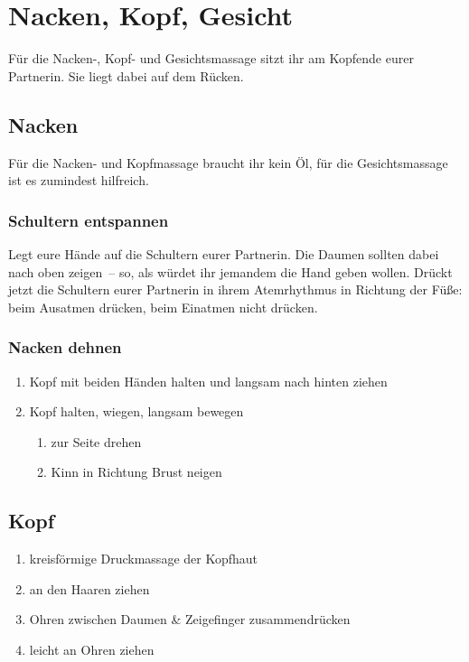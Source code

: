 \section{Nacken, Kopf, Gesicht}

Für die Nacken-, Kopf- und Gesichtsmassage sitzt ihr am Kopfende eurer Partnerin. Sie liegt dabei auf dem Rücken.

\subsection{Nacken}

Für die Nacken- und Kopfmassage braucht ihr kein Öl, für die Gesichtsmassage ist es zumindest hilfreich.

\subsubsection{Schultern entspannen}
Legt eure Hände auf die Schultern eurer Partnerin. Die Daumen sollten dabei nach oben zeigen~-- so, als würdet ihr jemandem die Hand geben wollen. Drückt jetzt die Schultern eurer Partnerin in ihrem Atemrhythmus in Richtung der Füße: beim Ausatmen drücken, beim Einatmen nicht drücken.

\subsubsection{Nacken dehnen}
\begin{enumerate}
\item Kopf mit beiden Händen halten und langsam nach hinten ziehen
\item Kopf halten, wiegen, langsam bewegen
	\begin{enumerate}
	\item zur Seite drehen
	\item Kinn in Richtung Brust neigen
	\end{enumerate}
\end{enumerate}


\subsection{Kopf}

\begin{enumerate}
\item kreisförmige Druckmassage der Kopfhaut
\item an den Haaren ziehen
\item Ohren zwischen Daumen \& Zeigefinger zusammendrücken
\item leicht an Ohren ziehen
\end{enumerate}

